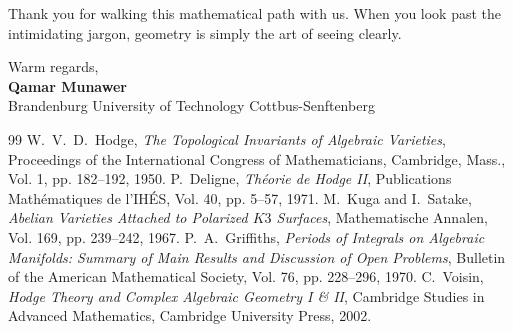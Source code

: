 \documentclass[11pt,a4paper]{article}
\theoremstyle{definition}
\begin{document}
Thank you for walking this mathematical path with us. When you look past the intimidating jargon, geometry is simply the art of seeing clearly.

\vspace{1.5em}
\noindent Warm regards,\\
\textbf{Qamar Munawer}\\
Brandenburg University of Technology Cottbus-Senftenberg


\begin{thebibliography}{99}
 W.~V.~D.~Hodge, \emph{The Topological Invariants of Algebraic Varieties}, Proceedings of the International Congress of Mathematicians, Cambridge, Mass., Vol. 1, pp. 182--192, 1950.
 P.~Deligne, \emph{Th\'eorie de Hodge II}, Publications Math\'ematiques de l'IH\'ES, Vol. 40, pp. 5--57, 1971.
 M.~Kuga and I.~Satake, \emph{Abelian Varieties Attached to Polarized $K3$ Surfaces}, Mathematische Annalen, Vol. 169, pp. 239--242, 1967.
 P.~A.~Griffiths, \emph{Periods of Integrals on Algebraic Manifolds: Summary of Main Results and Discussion of Open Problems}, Bulletin of the American Mathematical Society, Vol. 76, pp. 228--296, 1970.
 C.~Voisin, \emph{Hodge Theory and Complex Algebraic Geometry I \& II}, Cambridge Studies in Advanced Mathematics, Cambridge University Press, 2002.
\end{thebibliography}
\end{document}
